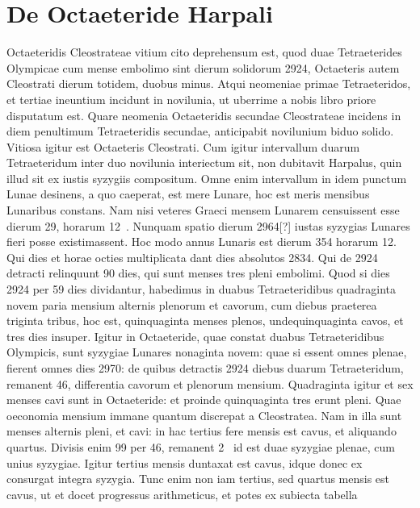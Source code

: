 \section{De Octaeteride Harpali}
%
Octaeteridis Cleostrateae vitium cito deprehensum est,
quod duae Tetraeterides Olympicae cum mense embolimo sint
dierum solidorum 2924, Octaeteris autem Cleostrati dierum
totidem, duobus minus.
Atqui neomeniae primae Tetraeteridos, et tertiae
ineuntium incidunt in novilunia, ut uberrime a nobis libro priore
disputatum est.
Quare neomenia Octaeteridis secundae Cleostrateae
incidens in diem penultimum Tetraeteridis secundae, anticipabit novilunium
biduo solido.
Vitiosa igitur est Octaeteris Cleostrati.
Cum
igitur intervallum duarum Tetraeteridum inter duo novilunia interiectum
sit, non dubitavit Harpalus, quin illud sit ex iustis syzygiis compositum.
Omne enim intervallum in idem punctum Lunae desinens,
a quo caeperat, est mere Lunare, hoc est meris mensibus Lunaribus
constans.
Nam nisi veteres Graeci mensem Lunarem censuissent esse
dierum 29, horarum 12~.
Nunquam spatio dierum 2964[?] iustas syzygias
Lunares fieri posse existimassent.
Hoc modo annus Lunaris est
dierum 354 horarum 12.
Qui dies et horae octies multiplicata dant dies
absolutos 2834.
Qui de 2924 detracti relinquunt 90 dies, qui sunt
menses tres pleni embolimi.
Quod si dies 2924 per 59 dies dividantur,
habedimus in duabus Tetraeteridibus quadraginta novem paria
mensium alternis plenorum et cavorum, cum diebus praeterea triginta
tribus, hoc est, quinquaginta menses plenos, undequinquaginta
cavos, et tres dies insuper.
Igitur in Octaeteride, quae constat duabus
Tetraeteridibus Olympicis, sunt syzygiae Lunares nonaginta
novem: quae si essent omnes plenae, fierent omnes dies 2970: de quibus
detractis 2924 diebus duarum Tetraeteridum, remanent 46, differentia
cavorum et plenorum mensium.
Quadraginta igitur et sex
menses cavi sunt in Octaeteride: et proinde quinquaginta tres erunt
pleni.
Quae oeconomia mensium immane quantum discrepat a Cleostratea.
Nam in illa sunt menses alternis pleni, et cavi: in hac tertius
fere mensis est cavus, et aliquando quartus.
Divisis enim 99 per
46, remanent 2~ id est duae syzygiae plenae,
 cum  unius syzygiae.
Igitur tertius mensis duntaxat est cavus, idque donec ex
  consurgat
integra syzygia.
Tunc enim non iam tertius, sed quartus mensis est cavus,
ut et docet progressus arithmeticus, et potes ex subiecta tabella
